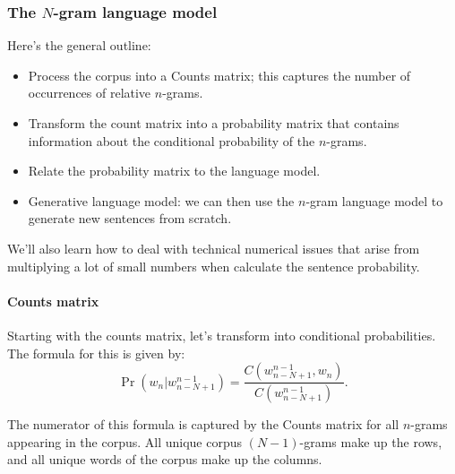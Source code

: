 \documentclass[12pt]{article}
\begin{document}
\subsubsection{The $N$-gram language model}
Here's the general outline:
\begin{itemize}
\item Process the corpus into a Counts matrix; this captures the number of   occurrences of relative $n$-grams.
\item Transform the count matrix into a probability matrix that contains   information about the conditional probability of the $n$-grams.
\item Relate the probability matrix to the language model.
\item Generative language model: we can then use the $n$-gram language model to generate new sentences from scratch.
\end{itemize}

We'll also learn how to deal with technical numerical issues that arise from multiplying a lot of small numbers when calculate the sentence probability.

\paragraph{Counts matrix} Starting with the counts matrix, let's transform into conditional probabilities. The formula for this is given by:
\begin{equation}
  \label{eq: ngramcountstoprobability}
  \Pr(w_n | w_{n-N+1}^{n-1}) = \frac{C(w_{n-N+1}^{n-1}, w_n)}{C(w_{n-N+1}^{n-1})}.
\end{equation}

The numerator of this formula is captured by the Counts matrix for all $n$-grams appearing in the corpus. All unique corpus $(N-1)$-grams make up the rows, and all unique words of the corpus make up the columns.
\end{document}
